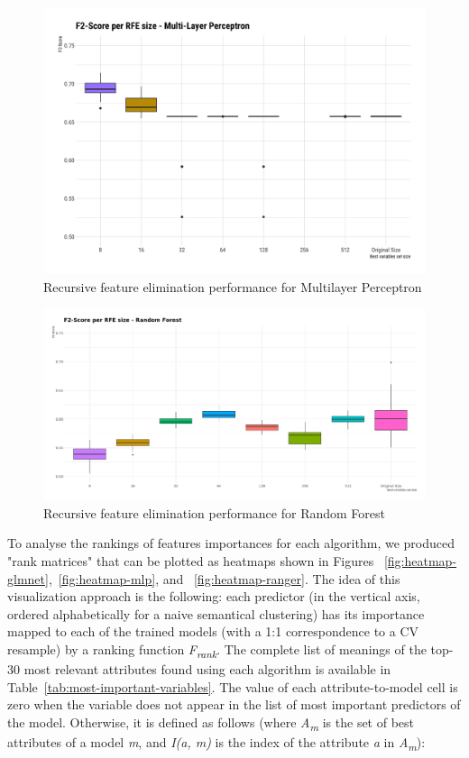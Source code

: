 \begin{figure}[H]
    \caption{Recursive feature elimination performance for Multilayer Perceptron}
    \centerline{\includegraphics[scale=.21]{../reports/results/models_and_evals/summary/rfe_mlpML.png}}
    \label{fig:rfe-mlp}
\end{figure}

\begin{figure}[H]
    \caption{Recursive feature elimination performance for Random Forest}
    \centerline{\includegraphics[scale=.21]{../reports/results/models_and_evals/summary/rfe_ranger.png}}
    \label{fig:rfe-ranger}
\end{figure}

To analyse the rankings of features importances for each algorithm, we produced "rank matrices" that can be plotted as heatmaps shown in Figures ~\ref{fig:heatmap-glmnet},~\ref{fig:heatmap-mlp}, and ~\ref{fig:heatmap-ranger}.
The idea of this visualization approach is the following: each predictor (in the vertical axis, ordered alphabetically for a naive semantical clustering) has its importance mapped to each of the trained models (with a 1:1 correspondence to a CV resample) by a ranking function \textit{F\textsubscript{rank}}.
The complete list of meanings of the top-30 most relevant attributes found using each algorithm is available in Table~\ref{tab:most-important-variables}.
The value of each attribute-to-model cell is zero when the variable does not appear in the list of most important predictors of the model.
Otherwise, it is defined as follows (where \textit{A\textsubscript{m}} is the set of best attributes of a model \textit{m}, and \textit{I(a, m)} is the index of the attribute \textit{a} in \textit{A\textsubscript{m}}):

